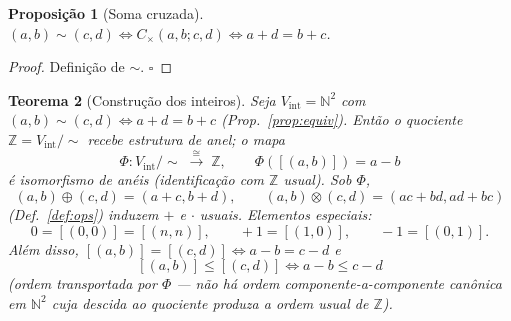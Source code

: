 \documentclass[11pt,a4paper]{article}
\newtheorem{teorema}{Teorema}
\newtheorem{proposicao}[teorema]{Proposição}
\begin{document}
\begin{proposicao}[Soma cruzada]\label{prop:somacruz}
$(a,b)\sim(c,d)\iff C_{\times}(a,b;c,d)\iff a+d=b+c$.
\end{proposicao}

\begin{proof}
Definição de $\sim$. $\square$
\end{proof}

\begin{teorema}[Construção dos inteiros]\label{thm:z}
Seja $V_{\mathrm{int}}=\mathbb{N}^{2}$ com $(a,b)\sim(c,d)\iff a+d=b+c$
(Prop.~\ref{prop:equiv}). Então o quociente $\mathbb{Z}=V_{\mathrm{int}}/{\sim}$ recebe estrutura
de anel; o mapa
\[
\boxed{\;
\Phi\colon V_{\mathrm{int}}/{\sim}\;\overset{\cong}{\longrightarrow}\;\mathbb{Z},\qquad
\Phi([(a,b)])=a-b\;}
\]
é isomorfismo de anéis (identificação com $\mathbb{Z}$ usual). Sob $\Phi$,
\[
(a,b)\oplus(c,d)=(a+c,b+d),\qquad
(a,b)\otimes(c,d)=(ac+bd,ad+bc)
\]
(Def.~\ref{def:ops}) induzem $+$ e $\cdot$ usuais. Elementos especiais:
\[
0=[(0,0)]=[(n,n)],\qquad +1=[(1,0)],\qquad -1=[(0,1)].
\]
Além disso, $[(a,b)]=[(c,d)]\iff a-b=c-d$ e
\[
[(a,b)]\le[(c,d)]\iff a-b\le c-d
\]
(\emph{ordem transportada} por $\Phi$ --- não há ordem
componente-a-componente canônica em $\mathbb{N}^{2}$ cuja descida ao
quociente produza a ordem usual de $\mathbb{Z}$).
\end{teorema}
\end{document}
